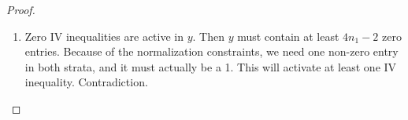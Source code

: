 \begin{proof}
\begin{enumerate}
\begin{enumerate}
          Contradiction.
        \item Suppose exactly one of these entries overlaps.
          We need $2n_1-3$ more active constraints. 
          Only two possible non-zero entries for $y$ remain.
          In order for the active constraints to span the entire vector space, at least one of these should be a zero entry.
          But then $y_j=1$ for the other entry, which activates another IV inequality. 
          Contradiction.
      \item If there are two overlapping zeroes the IV inequality couldn't be active.
    \end{enumerate}
    \item Zero IV inequalities are active in $y$. 
      Then $y$ must contain at least $4n_1-2$ zero entries.
      Because of the normalization constraints, we need one non-zero entry in both strata, and it must actually be a 1. 
      This will activate at least one IV inequality. 
      Contradiction.
  \end{enumerate}
\end{proof}


